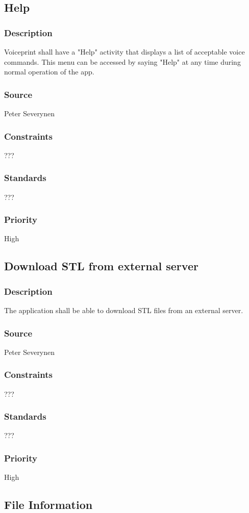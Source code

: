 \subsection{Help}
\subsubsection{Description}
Voiceprint shall have a "Help" activity that displays a list of acceptable voice commands. This menu can be accessed by saying "Help" at any time during normal operation of the app.
\subsubsection{Source}
Peter Severynen
\subsubsection{Constraints}
???
\subsubsection{Standards}
???
\subsubsection{Priority}
High
\subsection{Download STL from external server}
\subsubsection{Description}
The application shall be able to download STL files from an external server.
\subsubsection{Source}
Peter Severynen
\subsubsection{Constraints}
???
\subsubsection{Standards}
???
\subsubsection{Priority}
High
\subsection{File Information}
